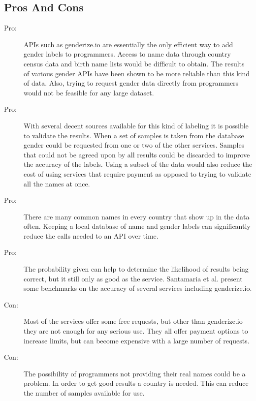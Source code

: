 \documentclass[12pt]{article}
\begin{document}
\subsection{Pros And Cons}
\begin{description}
    \item [Pro:] APIs such as genderize.io are essentially the only efficient way to add gender labels to programmers. Access to name data through country census data and birth name lists would be difficult to obtain. The results of various gender APIs have been shown to be more reliable than this kind of data\cite{Santamaria2018}. Also, trying to request gender data directly from programmers would not be feasible for any large dataset.
    
    \item [Pro:] With several decent sources available for this kind of labeling it is possible to validate the results. When a set of samples is taken from the database gender could be requested from one or two of the other services. Samples that could not be agreed upon by all results could be discarded to improve the accuracy of the labels. Using a subset of the data would also reduce the cost of using services that require payment as opposed to trying to validate all the names at once.
    
    \item [Pro:] There are many common names in every country that show up in the data often. Keeping a local database of name and gender labels can significantly reduce the calls needed to an API over time.

    \item [Pro:] The probability given can help to determine the likelihood of results being correct, but it still only as good as the service. Santamaria et al. present some benchmarks on the accuracy of several services including genderize.io\cite{Santamaria2018}.

    \item [Con:] Most of the services offer some free requests, but other than genderize.io they are not enough for any serious use. They all offer payment options to increase limits, but can become expensive with a large number of requests.

    \item [Con:] The possibility of programmers not providing their real names could be a problem. In order to get good results a country is needed. This can reduce the number of samples available for use.


\end{description}
\end{document}
